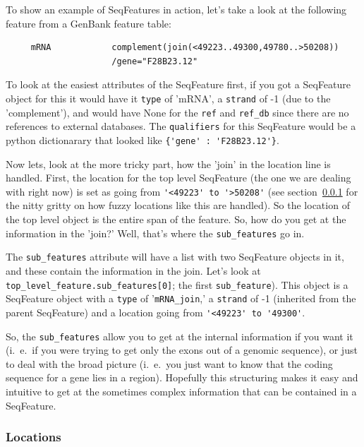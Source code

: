 \documentclass{report}
\begin{document}
To show an example of SeqFeatures in action, let's take a look at the following feature from a GenBank feature table:

\begin{verbatim}
     mRNA            complement(join(<49223..49300,49780..>50208))
                     /gene="F28B23.12"
\end{verbatim}

To look at the easiest attributes of the SeqFeature first, if you got a SeqFeature object for this it would have it \verb|type| of 'mRNA', a \verb|strand| of -1 (due to the 'complement'), and would have None for the \verb|ref| and \verb|ref_db| since there are no references to external databases. The \verb|qualifiers| for this SeqFeature would be a python dictionarary that looked like \verb|{'gene' : 'F28B23.12'}|.


Now lets, look at the more tricky part, how the 'join' in the location 
line is handled. First, the location for the top level SeqFeature (the 
one we are dealing with right now) is set as going from 
\verb|'<49223' to '>50208'| (see section~\ref{sec:locations} for 
the nitty gritty on how fuzzy locations like this are handled). 
So the location of the top level object is the entire span of the 
feature. So, how do you get at the information in the 'join?' 
Well, that's where the \verb|sub_features| go in.



The \verb|sub_features| attribute will have a list with two SeqFeature 
objects in it, and these contain the information in the join. Let's 
look at \verb|top_level_feature.sub_features[0]|; the first 
\verb|sub_feature|). This object is a SeqFeature object with a 
\verb|type| of '\verb|mRNA_join|,' a \verb|strand| of -1 (inherited 
from the parent SeqFeature) and a location going from 
\verb|'<49223' to '49300'|. 


So, the \verb|sub_features| allow you to get at the internal information if you want it (i.~e.~if you were trying to get only the exons out of a genomic sequence), or just to deal with the broad picture (i.~e.~you just want to know that the coding sequence for a gene lies in a region). Hopefully this structuring makes it easy and intuitive to get at the sometimes complex information that can be contained in a SeqFeature.

\subsubsection{Locations}
\label{sec:locations}
\end{document}
